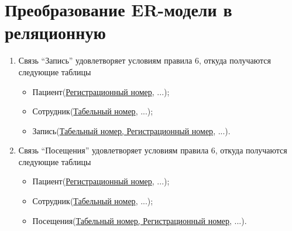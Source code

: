 \documentclass[14pt,a4paper,russian]{extreport}
\begin{document}
\section{Преобразование ER-модели в реляционную}
\begin{enumerate}[noitemsep]
\renewcommand\labelitemi{--}
    \item Связь ``Запись'' удовлетворяет условиям правила 6, откуда получаются следующие
        таблицы
	\begin{itemize}[noitemsep]
            \item Пациент(\underline{Регистрационный номер}, ...);
            \item Сотрудник(\underline{Табельный номер}, ...);
            \item Запись(\underline{Табельный номер, Регистрационный номер}, ...).
        \end{itemize}
    \item Связь ``Посещения'' удовлетворяет условиям правила 6, откуда получаются следующие
        таблицы
	\begin{itemize}[noitemsep]
            \item Пациент(\underline{Регистрационный номер}, ...);
            \item Сотрудник(\underline{Табельный номер}, ...);
            \item Посещения(\underline{Табельный номер, Регистрационный номер}, ...).
        \end{itemize}


\end{enumerate}
\end{document}
